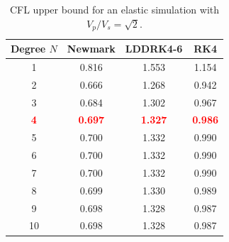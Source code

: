 \documentclass[oneside,english,onecolumn,letterpaper]{book}
\newcommand{\red}[1]{\textbf{\textcolor{Red}{#1}}}
\begin{document}
%
\begin{table}[hb]
\caption{CFL upper bound for an elastic simulation with $V_p/V_s = \sqrt{2}$.}
\centering
\begin{tabular}{c c c c}
\hline\hline
Degree $N$ & Newmark & LDDRK4-6 & RK4 \\ [0.5ex]
\hline
1 & 0.816 & 1.553 & 1.154 \\
2 & 0.666 & 1.268 & 0.942 \\
3 & 0.684 & 1.302 & 0.967 \\
\red{4} & \red{0.697} & \red{1.327} & \red{0.986} \\
5 & 0.700 & 1.332 & 0.990 \\
6 & 0.700 & 1.332 & 0.990 \\
7 & 0.700 & 1.332 & 0.990 \\
8 & 0.699 & 1.330 & 0.989 \\
9 & 0.698 & 1.328 & 0.987 \\
10 & 0.698 & 1.328 & 0.987 \\ [1ex]
\hline
\end{tabular}
\label{table:CFLelastic}
\end{table}

\end{document}
